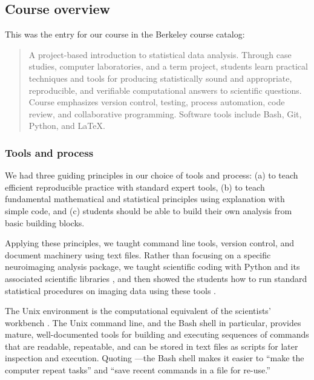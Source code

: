 \subsection{Course overview}

This was the entry for our course in the Berkeley course catalog:

\begin{quote}
A project-based introduction to statistical data analysis. Through case
studies, computer laboratories, and a term project, students learn
practical techniques and tools for producing statistically sound and
appropriate, reproducible, and verifiable computational answers to
scientific questions. Course emphasizes version control, testing,
process automation, code review, and collaborative programming.
Software tools include Bash, Git, Python, and \LaTeX.
\end{quote}

\subsubsection{Tools and process}

We had three guiding principles in our choice of tools and process:
(a) to teach efficient reproducible practice with standard expert tools,
(b) to teach fundamental mathematical and statistical principles using
explanation with simple code, and
(c) students should be able to build their own analysis from basic building
blocks.

Applying these principles, we taught command line tools, version control, and
document machinery using text files.  Rather than focusing on a specific
neuroimaging analysis package, we taught scientific coding with Python and its
associated scientific libraries \citep{millman2011python, perez2011python}, and
then showed the students how to run standard statistical procedures on imaging
data using these tools \citep{millman2007analysis}.

The Unix environment is the computational equivalent of the scientists'
workbench \citep{preeyanon2014reproducible}.  The Unix command line, and the
Bash shell in particular, provides mature, well-documented tools for building
and executing sequences of commands that are readable, repeatable, and can be
stored in text files as scripts for later inspection and execution.  Quoting
\cite{wilson2014best}---the Bash shell makes it easier to ``make the computer
repeat tasks'' and ``save recent commands in a file for re-use.''

